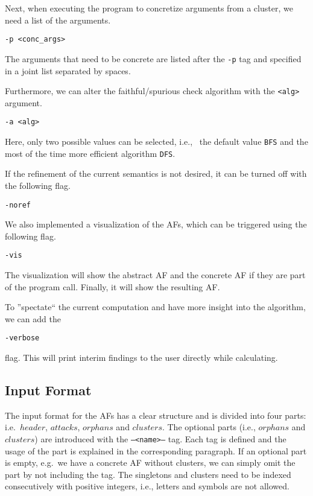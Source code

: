 Next, when executing the program to concretize arguments from a cluster, we need a list of the arguments.

\begin{center}
    \texttt{-p <conc\_args>}
\end{center}

The arguments that need to be concrete are listed after the \texttt{-p} tag and specified in a joint list separated by spaces.

Furthermore, we can alter the faithful/spurious check algorithm with the \texttt{<alg>} argument.

\begin{center}
    \texttt{-a <alg>}
\end{center}

Here, only two possible values can be selected, i.e., \ the default value \texttt{BFS} and the most of the time more efficient algorithm \texttt{DFS}.

If the refinement of the current semantics is not desired, it can be turned off with the following flag.

\begin{center}
    \texttt{-noref}
\end{center}

We also implemented a visualization of the AFs, which can be triggered using the following flag.

\begin{center}
    \texttt{-vis}
\end{center}

The visualization will show the abstract AF and the concrete AF if they are part of the program call. Finally, it will show the resulting AF.

To ''spectate`` the current computation and have more insight into the algorithm, we can add the 

\begin{center}
    \texttt{-verbose}
\end{center}

flag. This will print interim findings to the user directly while calculating.

\subsection{Input Format}
The input format for the AFs has a clear structure and is divided into four parts: i.e.\ $header$, $attacks$, $orphans$ and $clusters$. The optional parts (i.e., $orphans$ and $clusters$) are introduced with the \texttt{--<name>--} tag. Each tag is defined and the usage of the part is explained in the corresponding paragraph. If an optional part is empty, e.g.\ we have a concrete AF without clusters, we can simply omit the part by not including the tag. The singletons and clusters need to be indexed consecutively with positive integers, i.e., letters and symbols are not allowed.

